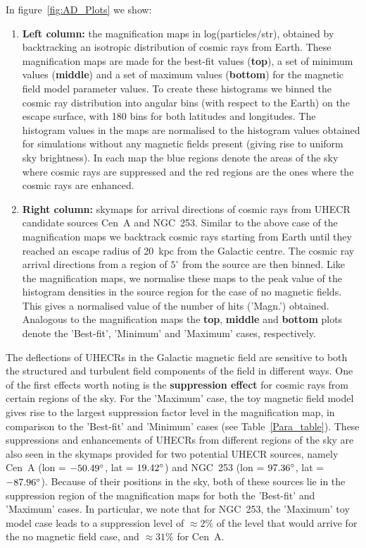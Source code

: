 \documentclass[usenatbib]{mnras}
\begin{document}
In figure~\ref{fig:AD_Plots} we show:

\begin{enumerate}
    \item {\bf Left column: } the magnification maps in log(particles/str), obtained by backtracking an isotropic distribution of cosmic rays from Earth. These magnification maps are made for the best-fit values (\textbf{top}), a set of minimum values (\textbf{middle}) and a set of maximum values (\textbf{bottom}) for the magnetic field model parameter values.
    To create these histograms we binned the cosmic ray distribution into angular bins (with respect to the Earth) on the escape surface, with 180 bins for both latitudes and longitudes. The histogram values in the maps are normalised to the histogram values obtained for simulations without any magnetic fields present (giving rise to uniform sky brightness). In each map the blue regions denote the areas of the sky where cosmic rays are suppressed and the red regions are the ones where the cosmic rays are enhanced.
    
    \item {\bf Right column: } skymaps for arrival directions
    of cosmic rays from UHECR candidate sources Cen~A and NGC~253. Similar to the above case of the magnification maps we backtrack cosmic rays starting from Earth until they reached an escape radius of 20~kpc from the Galactic centre. The cosmic ray arrival directions from a region of $5^{\circ}$ from the source are then binned.  Like the magnification maps, we normalise these maps to the peak value of the histogram densities in the source region for the case of no magnetic fields.  This gives a normalised value of the number of hits ('Magn.') obtained. Analogous to the magnification maps the \textbf{top}, \textbf{middle} and \textbf{bottom} plots denote the 'Best-fit', 'Minimum' and 'Maximum' cases, respectively. 
    \end{enumerate}

The deflections of UHECRs in the Galactic magnetic field are sensitive to both the structured and turbulent field components of the field in different ways. One of the first effects worth noting is the {\bf suppression effect} for cosmic rays from certain regions of the sky. For the 'Maximum' case, the toy magnetic field model gives rise to the largest suppression factor level in the magnification map, in comparison to the 'Best-fit' and 'Minimum' cases (see Table~\ref{Para_table}). These suppressions and enhancements of UHECRs from different regions of the sky are also seen in the skymaps provided for two potential UHECR sources, namely Cen~A (lon = $\rm -50.49^{\circ}$, lat = $\rm 19.42^{\circ}$) and NGC~253 (lon = $\rm 97.36^{\circ}$, lat = $\rm -87.96^{\circ}$). Because of their positions in the sky, both of these sources lie in the suppression region of the magnification maps for both the 'Best-fit' and 'Maximum' cases. In particular, we note that for NGC~253, the 'Maximum' toy model case leads to a suppression level of $\approx 2\%$ of the level that would arrive for the no magnetic field case, and $\approx 31\%$ for Cen~A.
\end{document}
